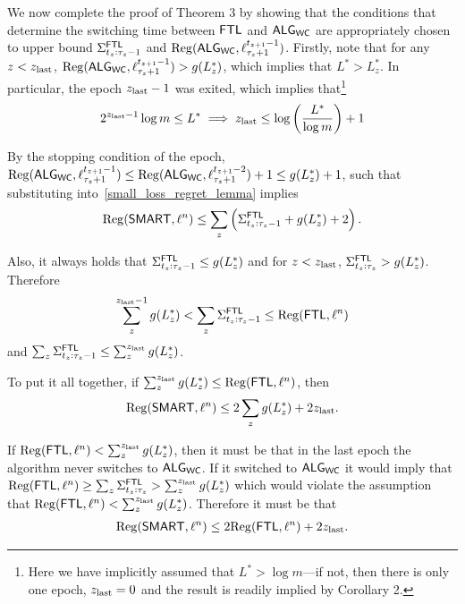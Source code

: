 We now complete the proof of Theorem 3 by showing that the conditions that determine the switching time between $\mathsf{FTL}$ and $\mathsf{ALG}_{\mathsf{WC}}$ are appropriately chosen to upper bound $\Sigma^{\mathsf{FTL}}_{t_z:\tau_z-1}$ and $\mathrm{Reg}(\mathsf{ALG}_{\mathsf{WC}}, \ell_{\tau_z+1}^{t_{z+1}-1})$.
Firstly, note that for any $z < z_{\mathrm{last}}$, $\mathrm{Reg}(\mathsf{ALG}_{\mathsf{WC}}, \ell_{\tau_z+1}^{t_{z+1}-1}) > g(L_z^*)$, which implies that $L^* > L_z^*$. In particular, the epoch $z_{\mathrm{last}}-1$ was exited, which implies that\footnote{Here we have implicitly assumed that $L^* > \log m$---if not, then there is only one epoch, $z_{\mathrm{last}} = 0$ and the result is readily implied by Corollary 2.} 
\[
2^{z_{\mathrm{last}}-1} \log m \le L^* \implies z_{\mathrm{last}} \le \log\left(\frac{L^*}{\log m}\right) + 1
\]

By the stopping condition of the epoch, $\mathrm{Reg}(\mathsf{ALG}_{\mathsf{WC}}, \ell_{\tau_z+1}^{t_{z+1}-1}) \leq \mathrm{Reg}(\mathsf{ALG}_{\mathsf{WC}}, \ell_{\tau_z+1}^{t_{z+1}-2}) + 1 \leq g(L_z^*) + 1$, such that substituting into~\cref{small_loss_regret_lemma} implies
\begin{align}
\mathrm{Reg}(\mathsf{SMART}, \ell^n)  \leq \sum_z \left(\Sigma^{\mathsf{FTL}}_{t_z:\tau_z-1} + g(L_z^*) + 2\right).
\end{align}


Also, it always holds that $\Sigma^{\mathsf{FTL}}_{t_z:\tau_z-1} \leq g(L_z^*)$ and for $z < z_{\mathrm{last}}$, $\Sigma^{\mathsf{FTL}}_{t_z:\tau_z} > g(L_z^*)$. Therefore 
\[\sum_z^{z_{\mathrm{last}}-1} g(L_z^*) < \sum_z \Sigma^{\mathsf{FTL}}_{t_z:\tau_z-1} \leq \mathrm{Reg}(\mathsf{FTL}, \ell^n)\]
and $\sum_z \Sigma^{\mathsf{FTL}}_{t_z:\tau_z-1} \leq \sum_z^{z_{\mathrm{last}}} g(L_z^*)$.

To put it all together, if $\sum_z^{z_{\mathrm{last}}} g(L_z^*) \leq \mathrm{Reg}(\mathsf{FTL},\ell^n)$, then 
\begin{align}
\mathrm{Reg}(\mathsf{SMART}, \ell^n)  \leq 2 \sum_z g(L_z^*) + 2 z_{\mathrm{last}}.
\end{align}

If $\mathrm{Reg}(\mathsf{FTL},\ell^n) < \sum_z^{z_{\mathrm{last}}} g(L_z^*)$, then it must be that in the last epoch the algorithm never switches to $\mathsf{ALG}_{\mathsf{WC}}$. If it switched to $\mathsf{ALG}_{\mathsf{WC}}$ it would imply that $\mathrm{Reg}(\mathsf{FTL},\ell^n) \geq \sum_z \Sigma^{\mathsf{FTL}}_{t_z:\tau_z} > \sum_z^{z_{\mathrm{last}}} g(L_z^*)$ which would violate the assumption that $\mathrm{Reg}(\mathsf{FTL},\ell^n) < \sum_z^{z_{\mathrm{last}}} g(L_z^*)$. Therefore it must be that
\begin{align}
\mathrm{Reg}(\mathsf{SMART}, \ell^n)  \leq 2 \mathrm{Reg}(\mathsf{FTL}, \ell^n) + 2 z_{\mathrm{last}}.
\end{align}

